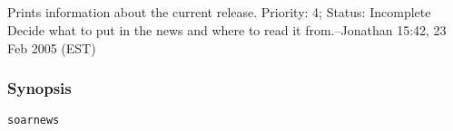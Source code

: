 \subsection{}
\label{soarnews}
Prints information about the current release. 
 Priority: 4; Status: Incomplete\\ 
Decide what to put in the news and where to read it from.--Jonathan 15:42, 23 Feb 2005 (EST) 
\subsubsection*{Synopsis}
\begin{verbatim}
soarnews
\end{verbatim}
